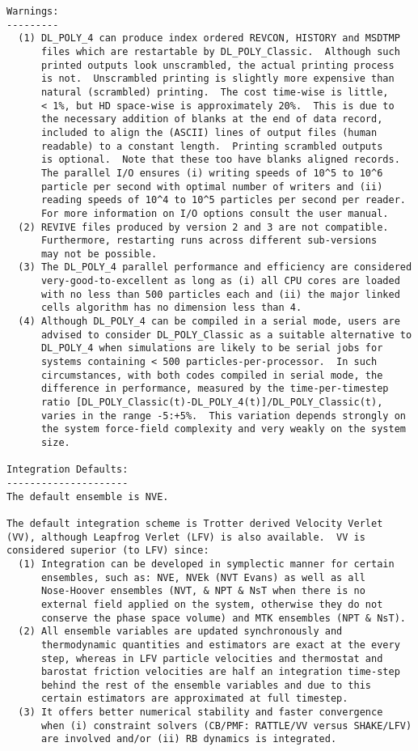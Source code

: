 \begin{verbatim}
Warnings:
---------
  (1) DL_POLY_4 can produce index ordered REVCON, HISTORY and MSDTMP
      files which are restartable by DL_POLY_Classic.  Although such
      printed outputs look unscrambled, the actual printing process
      is not.  Unscrambled printing is slightly more expensive than
      natural (scrambled) printing.  The cost time-wise is little,
      < 1%, but HD space-wise is approximately 20%.  This is due to
      the necessary addition of blanks at the end of data record,
      included to align the (ASCII) lines of output files (human
      readable) to a constant length.  Printing scrambled outputs
      is optional.  Note that these too have blanks aligned records.
      The parallel I/O ensures (i) writing speeds of 10^5 to 10^6
      particle per second with optimal number of writers and (ii)
      reading speeds of 10^4 to 10^5 particles per second per reader.
      For more information on I/O options consult the user manual.
  (2) REVIVE files produced by version 2 and 3 are not compatible.
      Furthermore, restarting runs across different sub-versions
      may not be possible.
  (3) The DL_POLY_4 parallel performance and efficiency are considered
      very-good-to-excellent as long as (i) all CPU cores are loaded
      with no less than 500 particles each and (ii) the major linked
      cells algorithm has no dimension less than 4.
  (4) Although DL_POLY_4 can be compiled in a serial mode, users are
      advised to consider DL_POLY_Classic as a suitable alternative to
      DL_POLY_4 when simulations are likely to be serial jobs for
      systems containing < 500 particles-per-processor.  In such
      circumstances, with both codes compiled in serial mode, the
      difference in performance, measured by the time-per-timestep
      ratio [DL_POLY_Classic(t)-DL_POLY_4(t)]/DL_POLY_Classic(t),
      varies in the range -5:+5%.  This variation depends strongly on
      the system force-field complexity and very weakly on the system
      size.

Integration Defaults:
---------------------
The default ensemble is NVE.

The default integration scheme is Trotter derived Velocity Verlet
(VV), although Leapfrog Verlet (LFV) is also available.  VV is
considered superior (to LFV) since:
  (1) Integration can be developed in symplectic manner for certain
      ensembles, such as: NVE, NVEk (NVT Evans) as well as all
      Nose-Hoover ensembles (NVT, & NPT & NsT when there is no
      external field applied on the system, otherwise they do not
      conserve the phase space volume) and MTK ensembles (NPT & NsT).
  (2) All ensemble variables are updated synchronously and
      thermodynamic quantities and estimators are exact at the every
      step, whereas in LFV particle velocities and thermostat and
      barostat friction velocities are half an integration time-step
      behind the rest of the ensemble variables and due to this
      certain estimators are approximated at full timestep.
  (3) It offers better numerical stability and faster convergence
      when (i) constraint solvers (CB/PMF: RATTLE/VV versus SHAKE/LFV)
      are involved and/or (ii) RB dynamics is integrated.


\end{verbatim}
